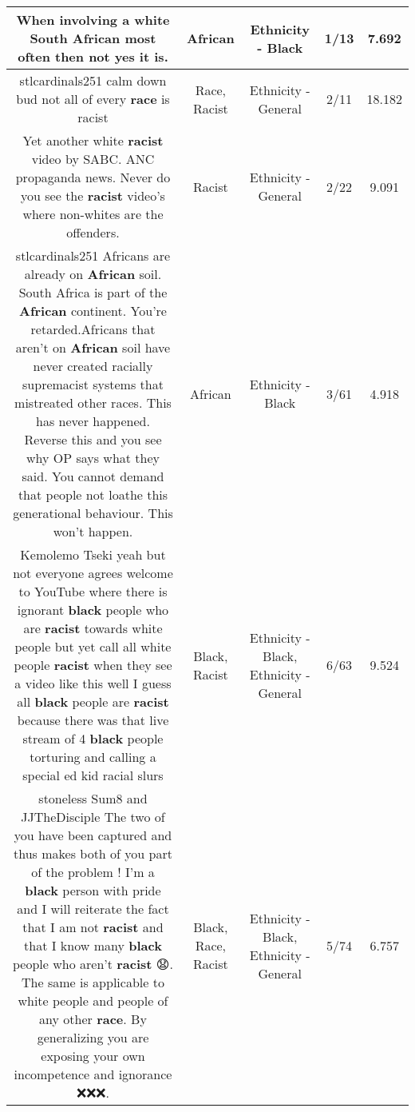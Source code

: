\documentclass[11pt]{article}
\newlength\mylength
\begin{document}
\begin{center}
\begin{longtable}{|C{.65\mylength}|C{.30\mylength}|C{.12\mylength}|C{.12\mylength}|C{.12\mylength}|}
  \small When involving a white South \textbf{African} most often then not yes it is.\normalsize   & African & Ethnicity - Black & 1/13 & 7.692 \\  \hline
  \small stlcardinals251 calm down bud not all of every \textbf{race} is racist\normalsize   & Race, Racist & Ethnicity - General & 2/11 & 18.182 \\  \hline
  \small Yet another white \textbf{racist} video by SABC. ANC propaganda news. Never do you see the \textbf{racist} video's where non-whites are the offenders.\normalsize   & Racist & Ethnicity - General & 2/22 & 9.091 \\  \hline
  \small stlcardinals251 Africans are already on  \textbf{African} soil. South Africa is part of the \textbf{African} continent. You're retarded.Africans that aren't on \textbf{African} soil have never created racially supremacist systems that mistreated other races. This has never happened. Reverse this and you see why OP says what they said. You cannot demand that people not loathe this generational behaviour. This won't happen.\normalsize   & African & Ethnicity - Black & 3/61 & 4.918 \\  \hline
  \small Kemolemo Tseki yeah but not everyone agrees welcome to YouTube where there is ignorant \textbf{black} people who are \textbf{racist} towards white people but yet call all white people \textbf{racist} when they see a video like this well I guess all \textbf{black} people are \textbf{racist} because there was that live stream of 4 \textbf{black} people torturing and calling a special ed kid racial slurs\normalsize   & Black, Racist & Ethnicity - Black, Ethnicity - General & 6/63 & 9.524 \\  \hline
  \small stoneless Sum8  and  JJTheDisciple The two of you have been captured and thus makes both of you part of the problem ! I'm a \textbf{black} person with pride and I will reiterate the fact that I am not \textbf{racist} and that I know many \textbf{black} people who aren't \textbf{racist} 😧. The same is applicable to white people and people of any other \textbf{race}. By generalizing you are exposing your own incompetence and ignorance ❌❌❌.\normalsize   & Black, Race, Racist & Ethnicity - Black, Ethnicity - General & 5/74 & 6.757 \\  \hline

\end{longtable}
\end{center}
\end{document}
